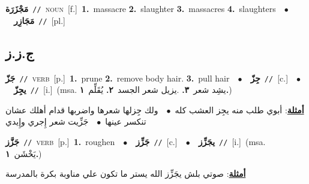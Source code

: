 \documentclass[10pt,a4paper,twoside]{article} %
\begin{document}
\begin{multicols}{2}
{\setlength\topsep{0pt}\textbf{\foreignlanguage{arabic}{مَجْزَرَة}}\ {\color{gray}\texttt{//}\color{black}}\ \textsc{noun}\ [f.]\ \textbf{1.}~massacre  \textbf{2.}~slaughter  \textbf{3.}~massacres  \textbf{4.}~slaughters\ \ $\bullet$\ \ \setlength\topsep{0pt}\textbf{\foreignlanguage{arabic}{مَجَازِر}}\ {\color{gray}\texttt{//}\color{black}}\ [pl.]\ } \vspace{2mm}

\vspace{-3mm}
\subsection*{\color{blue}\foreignlanguage{arabic}{ج.ز.ز}\color{blue}{}} 

{\setlength\topsep{0pt}\textbf{\foreignlanguage{arabic}{جَزّ}}\ {\color{gray}\texttt{//}\color{black}}\ \textsc{verb}\ [p.]\ \textbf{1.}~prune  \textbf{2.}~remove body hair.  \textbf{3.}~pull hair\ \ $\bullet$\ \ \setlength\topsep{0pt}\textbf{\foreignlanguage{arabic}{جِزّ}}\ {\color{gray}\texttt{//}\color{black}}\ [c.]\ \ $\bullet$\ \ \setlength\topsep{0pt}\textbf{\foreignlanguage{arabic}{يجِزّ}}\ {\color{gray}\texttt{//}\color{black}}\ [i.]\ \color{gray}(msa. \foreignlanguage{arabic}{يشِد شعر}~\foreignlanguage{arabic}{\textbf{٣.}}  .\foreignlanguage{arabic}{يزيل شعر الجسد}~\foreignlanguage{arabic}{\textbf{٢.}}  \foreignlanguage{arabic}{يُقَلِّم}~\foreignlanguage{arabic}{\textbf{١.}})\color{black}\  \begin{flushright}\color{gray}\foreignlanguage{arabic}{\textbf{\underline{\foreignlanguage{arabic}{أمثلة}}}: أبوي طلب منه يجِز العشب كله\ $\bullet$\ \  ولك جِزلها شعرها واضربها قدام أهلك عشان تنكسر عينها\ $\bullet$\ \  جَزِّيت شعر إِجري وإِيدي}\end{flushright}\color{black}} \vspace{2mm}

{\setlength\topsep{0pt}\textbf{\foreignlanguage{arabic}{جَزَّز}}\ {\color{gray}\texttt{//}\color{black}}\ \textsc{verb}\ [p.]\ \textbf{1.}~roughen\ \ $\bullet$\ \ \setlength\topsep{0pt}\textbf{\foreignlanguage{arabic}{جَزِّز}}\ {\color{gray}\texttt{//}\color{black}}\ [c.]\ \ $\bullet$\ \ \setlength\topsep{0pt}\textbf{\foreignlanguage{arabic}{يجَزِّز}}\ {\color{gray}\texttt{//}\color{black}}\ [i.]\ \color{gray}(msa. \foreignlanguage{arabic}{يَخْشَن}~\foreignlanguage{arabic}{\textbf{١.}})\color{black}\  \begin{flushright}\color{gray}\foreignlanguage{arabic}{\textbf{\underline{\foreignlanguage{arabic}{أمثلة}}}: صوتي بلش يجَزِّز الله يستر ما تكون علي مناوبة بكرة بالمدرسة}\end{flushright}\color{black}} \vspace{2mm}


\end{multicols}
\end{document}

